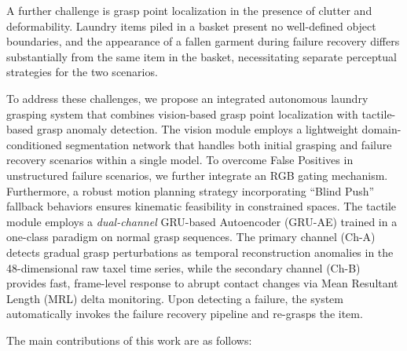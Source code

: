 \documentclass[pdflatex,sn-mathphys-num]{sn-jnl}%
\theoremstyle{thmstyleone}%
\theoremstyle{thmstyletwo}%
\theoremstyle{thmstylethree}%
\begin{document}
A further challenge is grasp point localization in the presence of clutter and deformability. Laundry items piled in a basket present no well-defined object boundaries, and the appearance of a fallen garment during failure recovery differs substantially from the same item in the basket, necessitating separate perceptual strategies for the two scenarios.

To address these challenges, we propose an integrated autonomous laundry grasping system that combines vision-based grasp point localization with tactile-based grasp anomaly detection. The vision module employs a lightweight domain-conditioned segmentation network that handles both initial grasping and failure recovery scenarios within a single model. To overcome False Positives in unstructured failure scenarios, we further integrate an RGB gating mechanism. Furthermore, a robust motion planning strategy incorporating ``Blind Push'' fallback behaviors ensures kinematic feasibility in constrained spaces. The tactile module employs a \textit{dual-channel} GRU-based Autoencoder (GRU-AE) trained in a one-class paradigm on normal grasp sequences. The primary channel (Ch-A) detects gradual grasp perturbations as temporal reconstruction anomalies in the 48-dimensional raw taxel time series, while the secondary channel (Ch-B) provides fast, frame-level response to abrupt contact changes via Mean Resultant Length (MRL) delta monitoring. Upon detecting a failure, the system automatically invokes the failure recovery pipeline and re-grasps the item.

The main contributions of this work are as follows:
\end{document}
